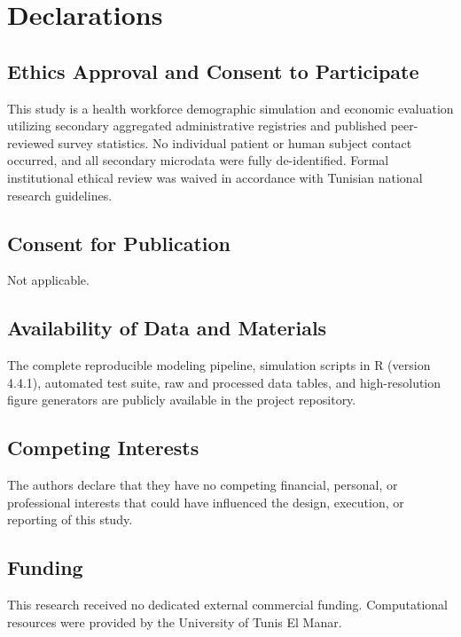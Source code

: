 \documentclass[
  11pt,
  a4paper]{article}
\begin{document}
\section{Declarations}\label{declarations}

\subsection{Ethics Approval and Consent to
Participate}\label{ethics-approval-and-consent-to-participate}

This study is a health workforce demographic simulation and economic
evaluation utilizing secondary aggregated administrative registries and
published peer-reviewed survey statistics. No individual patient or
human subject contact occurred, and all secondary microdata were fully
de-identified. Formal institutional ethical review was waived in
accordance with Tunisian national research guidelines.

\subsection{Consent for Publication}\label{consent-for-publication}

Not applicable.

\subsection{Availability of Data and
Materials}\label{availability-of-data-and-materials}

The complete reproducible modeling pipeline, simulation scripts in R
(version 4.4.1), automated test suite, raw and processed data tables,
and high-resolution figure generators are publicly available in the
project repository.

\subsection{Competing Interests}\label{competing-interests}

The authors declare that they have no competing financial, personal, or
professional interests that could have influenced the design, execution,
or reporting of this study.

\subsection{Funding}\label{funding}

This research received no dedicated external commercial funding.
Computational resources were provided by the University of Tunis El
Manar.
\end{document}
